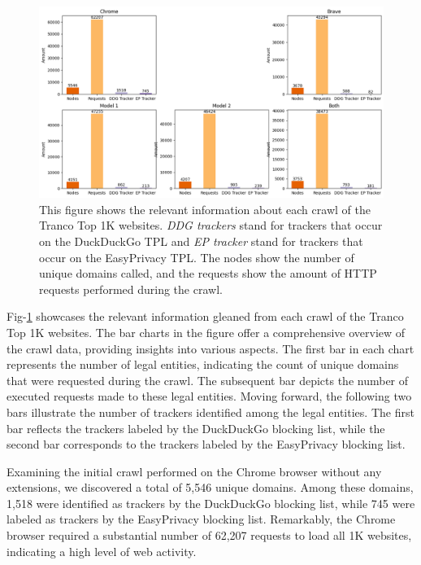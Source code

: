 \begin{figure}[ht!]  
  \centering
      \includegraphics[width=\linewidth, keepaspectratio]{images/CrawlPlot.png}
  \caption{This figure shows the relevant information about each crawl of the Tranco Top 1K websites. \emph{DDG trackers} stand for
  trackers that occur on the DuckDuckGo TPL and \emph{EP tracker} stand for trackers that occur on the EasyPrivacy TPL. The nodes show
the number of unique domains called, and the requests show the amount of HTTP requests performed during the crawl.}
  \label{fig:CrawlPlot}
\end{figure}
Fig-\ref{fig:CrawlPlot} showcases the relevant information gleaned from each crawl of the Tranco Top 1K websites. The bar charts in
the figure offer a comprehensive overview of the crawl data, providing insights into various aspects. The first bar in each
chart represents the number of legal entities, indicating the count of unique domains that were requested during the crawl.
The subsequent bar depicts the number of executed requests made to these legal entities. Moving forward, the following two bars
illustrate the number of trackers identified among the legal entities. The first bar reflects the trackers labeled by the DuckDuckGo
blocking list, while the second bar corresponds to the trackers labeled by the EasyPrivacy blocking list.

Examining the initial crawl performed on the Chrome browser without any extensions, we discovered a total of 5,546 unique
domains. Among these domains, 1,518 were identified as trackers by the DuckDuckGo blocking list, while 745 were labeled
as trackers by the EasyPrivacy blocking list. Remarkably, the Chrome browser required a substantial number of 62,207
requests to load all 1K websites, indicating a high level of web activity.

